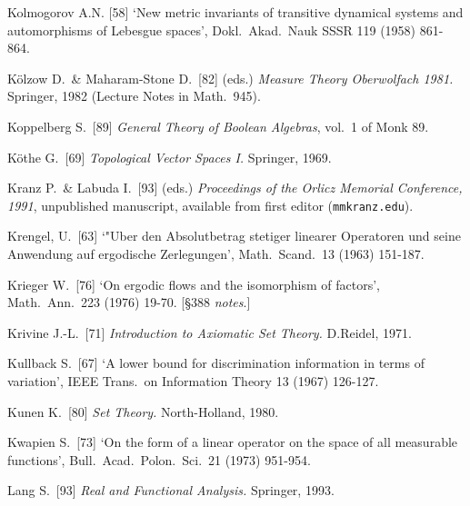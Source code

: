 {


Kolmogorov A.N. [58] `New metric invariants of transitive dynamical
systems and automorphisms of Lebesgue spaces', Dokl.\ Akad.\ Nauk SSSR
119 (1958) 861-864.  \cmmnt{[385P.]}

K\"olzow D.\ \& Maharam-Stone D.\ [82] (eds.) {\it Measure Theory
Oberwolfach 1981.}   Springer, 1982 (Lecture Notes in Math.\ 945).

Koppelberg S.\ [89] {\it General Theory of Boolean
Algebras\/}, vol.\ 1 of {\smc Monk 89}.

K\"othe G.\ [69] {\it Topological Vector Spaces I.}   Springer, 1969.
\cmmnt{[\S356 {\it notes\/}.]}

Kranz P.\ \& Labuda I.\ [93] (eds.) {\it Proceedings of the Orlicz
Memorial Conference, 1991\/}, unpublished manuscript, available from
first editor ({\tt mmkranz\@olemiss.edu}).

Krengel, U.\ [63] `"Uber den Absolutbetrag stetiger linearer
Operatoren und seine Anwendung auf ergodische Zerlegungen', Math.\
Scand.\ 13 (1963) 151-187.   \cmmnt{[371Xb.]}

Krieger W.\ [76] `On ergodic flows and the isomorphism of factors',
Math.\ Ann.\ 223 (1976) 19-70.   [\S388 {\it notes}.]

Krivine J.-L.\ [71] {\it Introduction to Axiomatic Set Theory.}
D.Reidel, 1971.  \cmmnt{[\S3A1.]}

Kullback S.\ [67] `A lower bound for discrimination information in terms of variation', IEEE Trans.\ on Information Theory 13 (1967) 126-127.
\cmmnt{[386H.]}

Kunen K.\ [80] {\it Set Theory.}  North-Holland, 1980.
\cmmnt{[\S3A1.]}

Kwapien S.\ [73] `On the form of a linear operator on the space of
all measurable functions', Bull.\ Acad.\ Polon.\ Sci.\ 21 (1973)
951-954.  \cmmnt{[\S375 {\it notes\/}.]}

\medskip %

Lang S.\ [93] {\it Real and Functional Analysis.}  Springer, 1993.
\cmmnt{[\S3A5.]}

}
